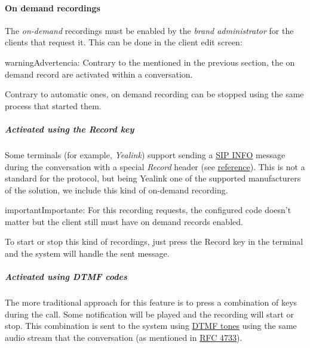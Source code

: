 \documentclass[letterpaper,10pt,spanish]{sphinxmanual}
\begin{document}
\paragraph{On demand recordings}
\label{administration_portal/client/residential/calls/call_recordings:on-demand-recordings}
The \emph{on-demand} recordings must be enabled by the \emph{brand administrator} for the
clients that request it. This can be done in the client edit screen:

\begin{notice}{warning}{Advertencia:}
Contrary to the {\hyperref[administration_portal/client/vpbx/services:services]{}} mentioned in the
previous section, the on demand record are activated within a conversation.
\end{notice}

Contrary to automatic ones, on demand recording can be stopped using the same
process that started them.


\subparagraph{Activated using the \emph{Record} key}
\label{administration_portal/client/residential/calls/call_recordings:activated-using-the-record-key}
Some terminals (for example, \emph{Yealink}) support sending a \href{https://tools.ietf.org/html/rfc6086}{SIP INFO} message during the conversation with a
special \emph{Record} header (see \href{http://www.yealink.com/Upload/document/UsingCallRecordingFeatureonYealinkPhones/UsingCallRecordingFeatureonYealinkSIPT2XPphonesRev\_610-20561729764.pdf}{reference}).
This is not a standard for the protocol, but being Yealink one of the supported
manufacturers of the solution, we include this kind of on-demand recording.

\begin{notice}{important}{Importante:}
For this recording requests, the configured code doesn't matter
but the client still must have on demand records enabled.
\end{notice}

To start or stop this kind of recordings, just press the Record key in the
terminal and the system will handle the sent message.


\subparagraph{Activated using \emph{DTMF} codes}
\label{administration_portal/client/residential/calls/call_recordings:activated-using-dtmf-codes}
The more traditional approach for this feature is to press a combination of
keys during the call. Some notification will be played and the recording will
start or stop. This combination is sent to the system using \href{https://es.wikipedia.org/wiki/Marcaci\%C3\%B3n\_por\_tonos}{DTMF tones} using the same audio
stream that the conversation (as mentioned in \href{https://tools.ietf.org/html/rfc4733}{RFC 4733}).
\end{document}

